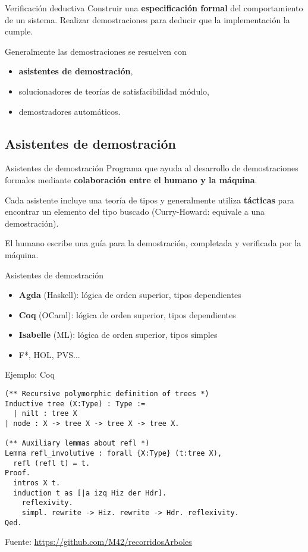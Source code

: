 \begin{frame}{Verificación deductiva}
Construir una \textbf{especificación formal} del
comportamiento de un sistema. Realizar demostraciones para deducir que la implementación la cumple.

Generalmente las demostraciones se resuelven
con
\begin{itemize}
\item \textbf{asistentes de demostración},
\item solucionadores de
teorías de satisfacibilidad módulo,
\item demostradores automáticos.
\end{itemize}
\end{frame}

\subsection{Asistentes de demostración}

\begin{frame}{Asistentes de demostración}
Programa que
ayuda al desarrollo de demostraciones formales mediante \textbf{colaboración entre el
humano y la máquina}.

Cada asistente incluye una teoría de tipos y generalmente utiliza \textbf{tácticas} para encontrar un elemento del tipo buscado (Curry-Howard: equivale a una demostración).

El humano
escribe una guía para la demostración, completada y verificada por la máquina.


\end{frame}

\begin{frame}{Asistentes de demostración}

\begin{itemize}
\item \textbf{Agda} (Haskell): lógica de orden superior, tipos dependientes
\item \textbf{Coq} (OCaml): lógica de orden superior, tipos dependientes
\item \textbf{Isabelle} (ML): lógica de orden superior, tipos simples
\item F*, HOL, PVS...
\end{itemize}


\end{frame}

\begin{frame}[fragile]{Ejemplo: Coq}
\scriptsize
\begin{verbatim}
(** Recursive polymorphic definition of trees *)
Inductive tree (X:Type) : Type :=
  | nilt : tree X
| node : X -> tree X -> tree X -> tree X.

(** Auxiliary lemmas about refl *)
Lemma refl_involutive : forall {X:Type} (t:tree X),
  refl (refl t) = t.
Proof.
  intros X t.
  induction t as [|a izq Hiz der Hdr].
    reflexivity.
    simpl. rewrite -> Hiz. rewrite -> Hdr. reflexivity.
Qed.
\end{verbatim}

Fuente: \url{https://github.com/M42/recorridosArboles}
\end{frame}

